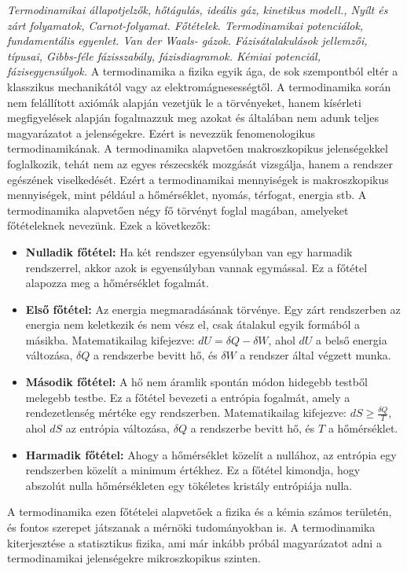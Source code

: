 \documentclass[../main.tex]{subfiles}
\begin{document}
\textit{Termodinamikai állapotjelzők, hőtágulás, ideális gáz, kinetikus modell., Nyílt és zárt folyamatok, Carnot-folyamat. Főtételek.
Termodinamikai potenciálok, fundamentális egyenlet. Van der Waals- gázok. Fázisátalakulások jellemzői, típusai, Gibbs-féle fázisszabály, fázisdiagramok.
Kémiai potenciál, fázisegyensúlyok.}
\newline
\newline
A termodinamika a fizika egyik ága, de sok szempontból eltér a klasszikus mechanikától vagy az elektromágnesességtől. A termodinamika során nem felállított axiómák alapján
vezetjük le a törvényeket, hanem kísérleti megfigyelések alapján fogalmazzuk meg azokat és általában nem adunk teljes magyarázatot a jelenségekre. Ezért is nevezzük fenomenologikus termodinamikának. A termodinamika alapvetően makroszkopikus jelenségekkel foglalkozik, tehát nem az egyes részecskék mozgását vizsgálja,
hanem a rendszer egészének viselkedését. Ezért a termodinamikai mennyiségek is makroszkopikus mennyiségek, mint például a hőmérséklet, nyomás, térfogat, energia stb.
A termodinamika alapvetően négy fő törvényt foglal magában, amelyeket főtételeknek nevezünk. Ezek a következők:
\begin{itemize}
    \item \textbf{Nulladik főtétel:} Ha két rendszer egyensúlyban van egy harmadik rendszerrel, akkor azok is egyensúlyban vannak egymással. Ez a főtétel alapozza meg a hőmérséklet fogalmát.
    \item \textbf{Első főtétel:} Az energia megmaradásának törvénye. Egy zárt rendszerben az energia nem keletkezik és nem vész el, csak átalakul egyik formából a másikba. Matematikailag kifejezve: $dU = \delta Q - \delta W$, ahol $dU$ a belső energia változása, $\delta Q$ a rendszerbe bevitt hő, és $\delta W$ a rendszer által végzett munka.
    \item \textbf{Második főtétel:} A hő nem áramlik spontán módon hidegebb testből melegebb testbe. Ez a főtétel bevezeti a entrópia fogalmát, amely a rendezetlenség mértéke egy rendszerben. Matematikailag kifejezve: $dS \geq \frac{\delta Q}{T}$, ahol $dS$ az entrópia változása, $\delta Q$ a rendszerbe bevitt hő, és $T$ a hőmérséklet.
    \item \textbf{Harmadik főtétel:} Ahogy a hőmérséklet közelít a nullához, az entrópia egy rendszerben közelít a minimum értékhez. Ez a főtétel kimondja, hogy abszolút nulla hőmérsékleten egy tökéletes kristály entrópiája nulla.
\end{itemize}
A termodinamika ezen főtételei alapvetőek a fizika és a kémia számos területén, és fontos szerepet játszanak a mérnöki tudományokban is. A termodinamika kiterjesztése a statisztikus fizika, ami már inkább próbál magyarázatot adni a termodinamikai jelenségekre mikroszkopikus szinten.
\end{document}
